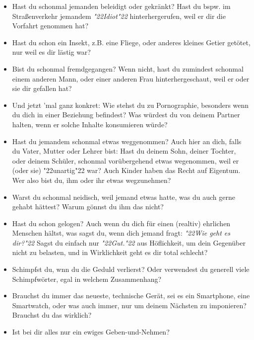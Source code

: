 \documentclass[10pt,a5paper]{article}
\newcommand{\q}[1]{\char"22{#1}\char"22 }
\newcommand{\qq}[1]{\textit{\q{#1}}}
\begin{document}
\begin{itemize}[nosep]
					Bist du eventuell Soldat oder \"ahnliches?
					Wenn ja,
					wer bist du,
					dass du dir herausnimmst,
					\"uber Leben oder eher Ableben deines \q{Feindes} zu entscheiden?
			\item	Hast du schonmal jemanden beleidigt oder gekr\"ankt?
					Hast du bspw. im Stra{\ss}enverkehr jemandem \qq{Idiot} hinterhergerufen,
					weil er dir die Vorfahrt genommen hat?
			\item	Hast du schon ein Insekt,
					z.B. eine Fliege,
					oder anderes kleines Getier get\"otet,
					nur weil es dir l\"astig war?
			\item	Bist du schonmal fremdgegangen?
					Wenn nicht,
					hast du zumindest schonmal einem anderen Mann,
					oder einer anderen Frau hinterhergeschaut,
					weil er oder sie dir gefallen hat?
			\item	Und jetzt 'mal ganz konkret:
					Wie stehst du zu Pornographie,
					besonders wenn du dich in einer Beziehung befindest?
					Was w\"urdest du von deinem Partner halten,
					wenn er solche Inhalte konsumieren w\"urde?
			\item	Hast du jemandem schonmal etwas weggenommen?
					Auch hier an dich, falls du Vater,
					Mutter oder Lehrer bist:
					Hast du deinem Sohn,
					deiner Tochter,
					oder deinem Sch\"uler,
					schonmal vor\"ubergehend etwas wegenommen,
					weil er (oder sie) \q{unartig} war?
					Auch Kinder haben das Recht auf Eigentum.
					Wer also bist du,
					ihm oder ihr etwas wegzunehmen?
			\item	Warst du schonmal neidisch,
					weil jemand etwas hatte,
					was du auch gerne gehabt h\"attest?
					Warum g\"onnst du ihm das nicht?
			\item	Hast du schon gelogen?
					Auch wenn du dich f\"ur einen (realtiv) ehrlichen Menschen h\"altst,
					was sagst du,
					wenn dich jemand fragt:
					\qq{Wie geht es dir?}
					Sagst du einfach nur \qq{Gut.} aus H\"oflichkeit,
					um dein Gegen\"uber nicht zu belasten,
					und in Wirklichkeit geht es dir total schlecht?
			\item	Schimpfst du,
					wnn du die Geduld verlierst?
					Oder verwendest du generell viele Schimpfw\"orter,
					egal in welchem Zusammenhang?
			\item	Brauchst du immer das neueste,
					technische Ger\"at,
					sei es ein Smartphone,
					eine Smartwatch,
					oder was auch immer,
					nur um deinem N\"achsten zu imponieren?
					Brauchst du das wirklich?
			\item	Ist bei dir alles nur ein ewiges Geben-und-Nehmen?

\end{itemize}
\end{document}

